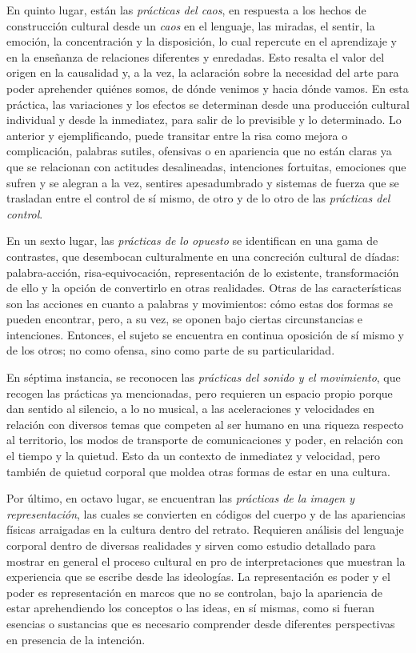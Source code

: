 \documentclass{textolivre}
\begin{document}
En quinto lugar, están las \textit{prácticas del caos}, en respuesta a los hechos de construcción cultural desde un \textit{caos} en el lenguaje, las miradas, el sentir, la emoción, la concentración y la disposición, lo cual repercute en el aprendizaje y en la enseñanza de relaciones diferentes y enredadas. Esto resalta el valor del origen en la causalidad y, a la vez, la aclaración sobre la necesidad del arte para poder aprehender quiénes somos, de dónde venimos y hacia dónde vamos. En esta práctica, las variaciones y los efectos se determinan desde una producción cultural individual y desde la inmediatez, para salir de lo previsible y lo determinado. Lo anterior y ejemplificando, puede transitar entre la risa como mejora o complicación, palabras sutiles, ofensivas o en apariencia que no están claras ya que se relacionan con actitudes desalineadas, intenciones fortuitas, emociones que sufren y se alegran a la vez, sentires apesadumbrado y sistemas de fuerza que se trasladan entre el control de sí mismo, de otro y de lo otro de las \textit{prácticas del control}.

En un sexto lugar, las \textit{prácticas de lo opuesto} se identifican en una gama de contrastes, que desembocan culturalmente en una concreción cultural de díadas: palabra-acción, risa-equivocación, representación de lo existente, transformación de ello y la opción de convertirlo en otras realidades. Otras de las características son las acciones en cuanto a palabras y movimientos: cómo estas dos formas se pueden encontrar, pero, a su vez, se oponen bajo ciertas circunstancias e intenciones. Entonces, el sujeto se encuentra en continua oposición de sí mismo y de los otros; no como ofensa, sino como parte de su particularidad.

En séptima instancia, se reconocen las \textit{prácticas del sonido y el movimiento}, que recogen las prácticas ya mencionadas, pero requieren un espacio propio porque dan sentido al silencio, a lo no musical, a las aceleraciones y velocidades en relación con diversos temas que competen al ser humano en una riqueza respecto al territorio, los modos de transporte de comunicaciones y poder, en relación con el tiempo y la quietud. Esto da un contexto de inmediatez y velocidad, pero también de quietud corporal que moldea otras formas de estar en una cultura. 

Por último, en octavo lugar, se encuentran las \textit{prácticas de la imagen y representación}, las cuales se convierten en códigos del cuerpo y de las apariencias físicas arraigadas en la cultura dentro del retrato. Requieren análisis del lenguaje corporal dentro de diversas realidades y sirven como estudio detallado para mostrar en general el proceso cultural en pro de interpretaciones que muestran la experiencia que se escribe desde las ideologías. La representación es poder y el poder es representación en marcos que no se controlan, bajo la apariencia de estar aprehendiendo los conceptos o las ideas, en sí mismas, como si fueran esencias o sustancias que es necesario comprender desde diferentes perspectivas en presencia de la intención.	
\end{document}

